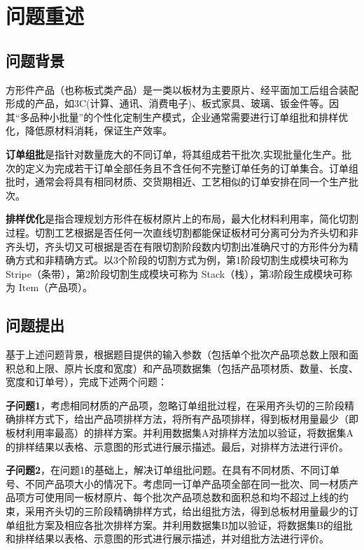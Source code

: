 \documentclass[bwprint]{gmcmthesis}
\begin{document}

\section{问题重述}
\subsection{问题背景}

方形件产品（也称板式类产品）是一类以板材为主要原片、经平面加工后组合装配形成的产品，如3C(计算、通讯、消费电子)、板式家具、玻璃、钣金件等。因其“多品种小批量”的个性化定制生产模式，企业通常需要进行订单组批和排样优化，降低原材料消耗，保证生产效率。

\textbf{订单组批}是指针对数量庞大的不同订单，将其组成若干批次,实现批量化生产。批次的定义为完成若干订单全部任务且不含任何不完整订单任务的订单集合。订单组批时，通常会将具有相同材质、交货期相近、工艺相似的订单安排在同一个生产批次。

\textbf{排样优化}是指合理规划方形件在板材原片上的布局，最大化材料利用率，简化切割过程。切割工艺根据是否任何一次直线切割都能保证板材可分离可分为齐头切和非齐头切，齐头切又可根据是否在有限切割阶段数内切割出准确尺寸的方形件分为精确方式和非精确方式。以3个阶段的切割方式为例，第1阶段切割生成模块可称为 {\rm Stripe}（条带），第2阶段切割生成模块可称为 {\rm Stack}（栈），第3阶段生成模块可称为 {\rm Item}（产品项）。

\subsection{问题提出}
基于上述问题背景，根据题目提供的输入参数（包括单个批次产品项总数上限和面积总和上限、原片长度和宽度）和产品项数据集（包括产品项材质、数量、长度、宽度和订单号），完成下述两个问题：

\textbf{子问题1}，考虑相同材质的产品项，忽略订单组批过程，在采用齐头切的三阶段精确排样方式下，给出产品项排样方法，将所有产品项排样，得到板材用量最少（即板材利用率最高）的排样方案。并利用数据集A对排样方法加以验证，将数据集A的排样结果以表格、示意图的形式进行展示描述。最后，对排样方法进行评价。

\textbf{子问题2}，在问题1的基础上，解决订单组批问题。在具有不同材质、不同订单号、不同产品项大小的情况下。考虑同一订单产品项全部在同一批次、同一材质产品项方可使用同一板材原片、每个批次产品项总数和面积总和均不超过上线的约束，采用齐头切的三阶段精确排样方式，给出组批方法，得到总板材用量最少的订单组批方案及相应各批次排样方案。并利用数据集B加以验证，将数据集B的组批和排样结果以表格、示意图的形式进行展示描述，并对组批方法进行评价。
\end{document}

